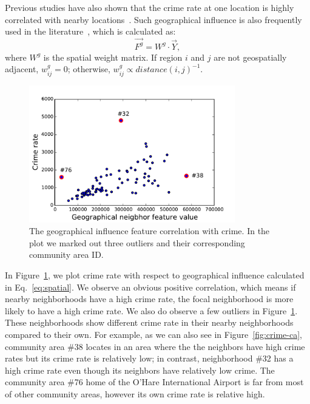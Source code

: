 Previous studies have also shown that the crime rate at one location is highly correlated with nearby locations~\cite{GSGL01, Bur88}. Such geographical influence is also frequently used in the literature~\cite{ACC00, MoSa97}, which is calculated as:
\begin{equation}
\vec{F^g} = W^g \cdot \vec{Y},
\label{eq:spatial}
\end{equation}
where $W^g$ is the spatial weight matrix. If region $i$ and $j$ are not geospatially adjacent, $w_{ij}^g = 0$; otherwise, $w_{ij}^g \propto distance(i,j)^{-1}$.

\begin{figure}[t]
\centering
\includegraphics[width=0.8\textwidth]{fig/spatial-crime-rate.pdf}
\caption{The geographical influence feature correlation with crime. In the plot we marked out three outliers and their corresponding community area ID.}
\label{fig:spatial}
\end{figure}

In Figure~\ref{fig:spatial},  we plot crime rate with respect to geographical influence calculated in Eq.~\ref{eq:spatial}. We observe an obvious positive correlation, which means if nearby neighborhoods have a high crime rate, the focal neighborhood is more likely to have a high crime rate. We also do observe a few outliers in Figure~\ref{fig:spatial}. These neighborhoods show different crime rate in their nearby neighborhoods compared to their own. For example, as we can also see in Figure~\ref{fig:crime-ca}, community area \#38 locates in an area where the the neighbors have high crime rates but its crime rate is relatively low; in contrast, neighborhood \#32 has a high crime rate even though its neighbors have relatively low crime. The community area \#76 home of the O'Hare International Airport is far from most of other community areas, however its own crime rate is relative high.





